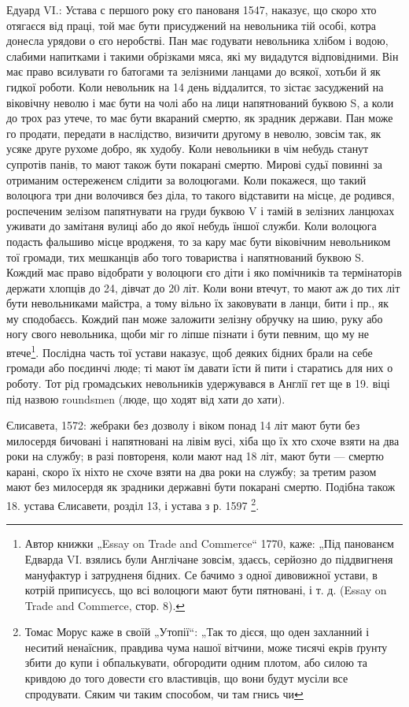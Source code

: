 Едуард VI.: Устава с першого року єго панованя 1547, наказує, що скоро хто отягаєся від праці, той
має бути присуджений на невольника тій особі, котра донесла урядови
о єго неробстві. Пан має годувати невольника хлібом і водою, слабими напитками і такими обрізками
мяса, які му видадутся відповідними. Він має право всилувати го батогами
та зелізними ланцами до всякої, хотьби й як гидкої роботи. Коли невольник на 14 день
віддалится, то зістає засуджений на віковічну неволю і має бути на чолі або на
лици напятнований буквою S, а коли до трох раз утече, то має бути вкараний смертю, як зрадник
держави. Пан може го продати, передати в наслідство, визичити другому в неволю, зовсім так, як усяке
друге рухоме добро, як худобу. Коли невольники в чім небудь станут супротів панів, то мают також
бути покарані смертю. Мирові судьї повинні за отриманим остереженєм слідити за волоцюгами. Коли
покажеся, що такий волоцюга три дни волочився без діла, то такого відставити на місце, де родився,
роспеченим зелізом папятнувати на груди буквою V і тамій в зелізних ланцюхах
уживати до замітаня вулиці або до якої небудь їншої служби. Коли волоцюга подасть фальшиво місце
вродженя, то за кару має бути віковічним невольником тої громади,
тих мешканців або того товариства і напятнований буквою S. Кождий має право відобрати у волоцюги єго
діти і яко помічників та термінаторів держати хлопців до 24, дівчат до 20 літ. Коли вони втечут, то
мают аж до тих літ бути невольниками майстра, а тому вільно їх заковувати в ланци, бити і пр., як му
сподобаєсь. Кождий пан може заложити зелізну обручку на шию, руку або ногу свого невольника, щоби
міг го ліпше пізнати і бути певним, що му не втече\footnote{
Автор книжки „Essay on Trade and Commerce“ 1770, каже: „Під панованєм Едварда VI. взялись
були Англічане зовсім, здаєсь, серйозно до піддвигненя мануфактур і затрудненя бідних. Се бачимо з
одної дивовижної устави, в котрій приписуєсь, що всі волоцюги мают бути пятновані, і т. д. (Essay on
Trade and Commerce, стор. 8).
}. Послідна часть тої устави наказує, щоб
деяких бідних брали на себе громади або поєдинчі люде; ті мают їм давати їсти
й пити і старатись для них о роботу. Тот рід громадських невольників удержувався в Англії гет ще в
19. віці під назвою roundsmen (люде, що ходят від хати до хати).

Єлисавета, 1572: жебраки без дозволу і віком понад 14 літ мают бути без милосердя бичовані і
напятновані на лівім вусі, хіба що їх хто схоче взяти на два роки на службу; в разі повтореня, коли
мают над 18 літ, мают бути — смертю карані, скоро їх ніхто не схоче взяти на два роки на службу; за
третим разом мают без милосердя як зрадники державні бути покарані смертю. Подібна також 18. устава
Єлисавети, розділ 13, і устава з р. 1597 \footnote{
Томас Морус каже в своїй „Утопії“: „Так то дієся, що оден захланний і неситий ненаїсник,
правдива чума нашої вітчини, може тисячі екрів ґрунту збити до купи і обпалькувати, обгородити одним
плотом, або силою та кривдою до того довести єго властивців, що вони будут мусіли все спродувати.
Сяким чи таким способом, чи там гнись чи
}.

